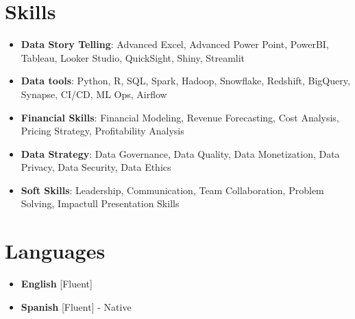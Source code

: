 \documentclass[11pt,a4paper,sans]{moderncv}
\begin{document}
\vspace{-1.5em}

\section{Skills}
\begin{itemize}[label=\textbullet, itemsep=-0.2em]
\item \textbf{Data Story Telling}: Advanced Excel, Advanced Power Point, PowerBI, Tableau, Looker Studio, QuickSight, Shiny, Streamlit
\item \textbf{Data tools}: Python, R, SQL, Spark, Hadoop, Snowflake, Redshift, BigQuery, Synapse, CI/CD, ML Ops, Airflow
\item \textbf{Financial Skills}: Financial Modeling, Revenue Forecasting, Cost Analysis, Pricing Strategy, Profitability Analysis
\item \textbf{Data Strategy}: Data Governance, Data Quality, Data Monetization, Data Privacy, Data Security, Data Ethics
\item \textbf{Soft Skills}: Leadership, Communication, Team Collaboration, Problem Solving, Impactull Presentation Skills
\end{itemize}


\vspace{-1.5em}

\section{Languages}
\begin{multicols}{2}
\begin{itemize}[label=\textbullet, itemsep=-0.2em]
\item \textbf{English} [Fluent]
\item \textbf{Spanish} [Fluent] - Native
\end{itemize}
\end{multicols}
\end{document}
